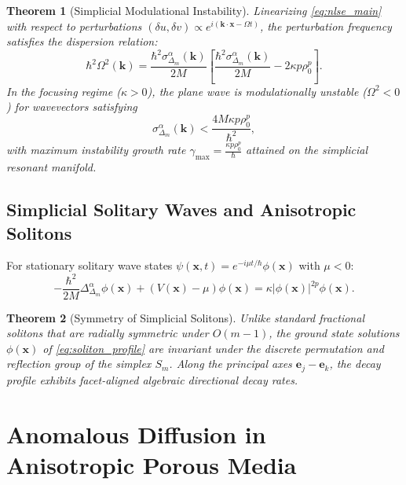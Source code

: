 \documentclass[11pt,a4paper]{article}
\theoremstyle{plain}
\newtheorem{theorem}{Theorem}[section]
\theoremstyle{definition}
\theoremstyle{remark}
\numberwithin{equation}{section}
\begin{document}
\begin{theorem}[Simplicial Modulational Instability]
Linearizing \eqref{eq:nlse_main} with respect to perturbations $(\delta u, \delta v) \propto e^{i(\mathbf{k}\cdot\mathbf{x} - \Omega t)}$, the perturbation frequency satisfies the dispersion relation:
\begin{equation}
\hbar^2 \Omega^2(\mathbf{k}) = \frac{\hbar^2 \sigma_{\Delta_m}^\alpha(\mathbf{k})}{2M} \left[ \frac{\hbar^2 \sigma_{\Delta_m}^\alpha(\mathbf{k})}{2M} - 2\kappa p \rho_0^p \right].
\end{equation}
In the focusing regime ($\kappa > 0$), the plane wave is modulationally unstable ($\Omega^2 < 0$) for wavevectors satisfying
\begin{equation}
\sigma_{\Delta_m}^\alpha(\mathbf{k}) < \frac{4M\kappa p \rho_0^p}{\hbar^2},
\end{equation}
with maximum instability growth rate $\gamma_{\max} = \frac{\kappa p \rho_0^p}{\hbar}$ attained on the simplicial resonant manifold.
\end{theorem}

\subsection{Simplicial Solitary Waves and Anisotropic Solitons}

For stationary solitary wave states $\psi(\mathbf{x}, t) = e^{-i\mu t/\hbar} \phi(\mathbf{x})$ with $\mu < 0$:
\begin{equation}
\label{eq:soliton_profile}
-\frac{\hbar^2}{2M}\Delta_{\Delta_m}^\alpha \phi(\mathbf{x}) + (V(\mathbf{x}) - \mu)\phi(\mathbf{x}) = \kappa |\phi(\mathbf{x})|^{2p}\phi(\mathbf{x}).
\end{equation}

\begin{theorem}[Symmetry of Simplicial Solitons]
Unlike standard fractional solitons that are radially symmetric under $O(m-1)$, the ground state solutions $\phi(\mathbf{x})$ of \eqref{eq:soliton_profile} are invariant under the discrete permutation and reflection group of the simplex $S_m$. Along the principal axes $\mathbf{e}_j - \mathbf{e}_k$, the decay profile exhibits facet-aligned algebraic directional decay rates.
\end{theorem}

\section{Anomalous Diffusion in Anisotropic Porous Media}
\end{document}

